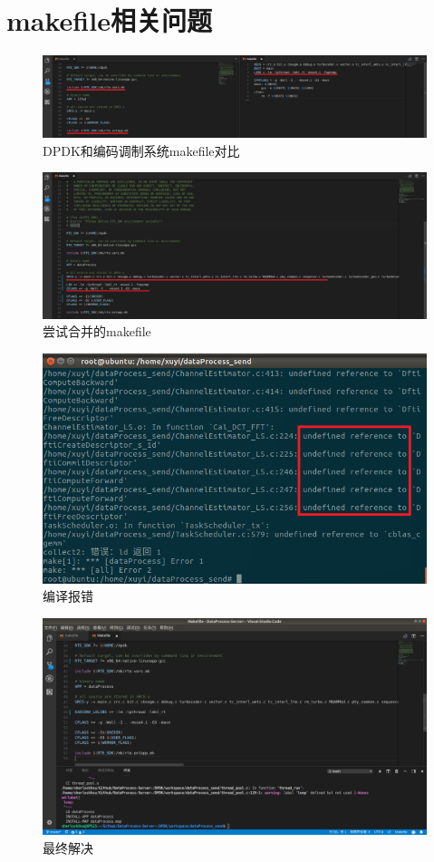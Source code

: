 \documentclass{article}
\begin{document}
\section{makefile相关问题}
\begin{figure}[H]
	\centering
	\includegraphics[width = \textwidth]{makefile_compare.png}
	\caption{DPDK和编码调制系统makefile对比}
\end{figure}
\begin{figure}[H]
	\centering
	\includegraphics[width = \textwidth]{makefile_try.png}
	\caption{尝试合并的makefile}
\end{figure}
\begin{figure}[H]
	\centering
	\includegraphics[width = .8\textwidth]{fault_makefile.png}
	\caption{编译报错}
\end{figure}
\begin{figure}[H]
	\centering
	\includegraphics[width = \textwidth]{makefile_final.png}
	\caption{最终解决}
\end{figure}
\end{document}
